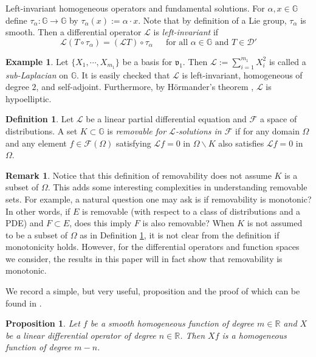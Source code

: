 \documentclass[12pt,a4paper,reqno]{amsart}
\renewcommand{\L}{\mathcal{L}}
\newcommand{\vf}{\mathfrak{v}}
\newcommand{\D}{\mathcal{D}}
\newcommand{\R}{\mathbb{R}}
\renewcommand{\a}{\alpha}
\newcommand{\G}{\mathbb{G}}
\numberwithin{equation}{section}
\newtheorem{prop}[thm]{Proposition}
\theoremstyle{definition}
\newtheorem{defn}[thm]{Definition}
\newtheorem{exmp}[thm]{Example}
\newtheorem{rem}[thm]{Remark}
\begin{document}
\begin{subsection}{Left-invariant homogeneous operators and fundamental solutions.}
For $\a, x \in \G$ define $\tau_{\a} : \G \rightarrow \G$ by $\tau_{\a}(x) := \a \cdot x$. Note that by definition of a Lie group, $\tau_{\a}$ is smooth. Then a differential operator $\L$ is \textit{left-invariant} if \begin{equation}\label{left-inv-op}
\L (T \circ \tau_{\a}) = (\L T)\circ \tau_{\a} \, \quad \text{ for all }\a \in \G \text{ and }T \in \D'    
\end{equation}
\begin{exmp}
Let $\{X_1, \cdots, X_{m_1}\}$ be a basis for $\vf_1$. Then $\L := \sum_{i=1}^{m_1}X_i^2$ is called a \textit{sub-Laplacian} on $\G$. It is easily checked that $\L$ is left-invariant, homogeneous of degree $2$, and self-adjoint. Furthermore, by H\"{o}rmander's theorem \cite[Theorem $1$ in the preface]{BLU}, $\L$ is hypoelliptic.   
\end{exmp}

\begin{defn}\label{removable-sets-defn}
Let $\L$ be a linear partial differential equation and $\mathcal{F}$ a space of distributions. A set $K \subset \G$ is \textit{removable for $\L$-solutions in $\mathcal{F}$} if for any domain $\Omega$ and any element $f \in \mathcal{F}(\Omega)$ satisfying $\L f = 0$ in $\Omega \backslash K$ also satisfies $\L f = 0$ in $\Omega$.
\end{defn}

\begin{rem}
Notice that this definition of removability does not assume $K$ is a subset of $\Omega$. This adds some interesting complexities in understanding removable sets. For example, a natural question one may ask is if removability is monotonic? In other words, if $E$ is removable (with respect to a class of distributions and a PDE) and $F \subset E$, does this imply $F$ is also removable? When $K$ is not assumed to be a subset of $\Omega$ as in Definition \ref{removable-sets-defn}, it is not clear from the definition if monotonicity holds. However, for the differential operators and function spaces we consider, the results in this paper will in fact show that removability is monotonic.
\end{rem}


We record a simple, but very useful, proposition and the proof of which can be found in \cite[Page $32$]{BLU}.
\begin{prop}\label{hom-degree-of-deriv}
Let $f$ be a smooth homogeneous function of degree $m \in \R$ and $X$ be a linear differential operator of degree $n \in \R$. Then $Xf$ is a homogeneous function of degree $m-n$.
\end{prop}


\end{subsection}
\end{document}
